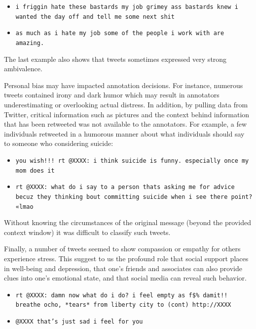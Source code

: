 \documentclass[11pt]{article}
\begin{document}
\begin{itemize}
\footnotesize
\item \texttt{i friggin hate these bastards \@ my job grimey ass bastards knew i wanted the day off and tell me some next shit}
\item \texttt{as much as i hate my job some of the people i work with are amazing.}
\end{itemize}

The last example also shows that tweets sometimes expressed very strong ambivalence.

Personal bias may have impacted annotation decisions. For instance, numerous tweets contained irony and dark humor which may result in annotators underestimating or overlooking actual distress. In addition, by pulling data from Twitter, critical information such as pictures and the context behind information that has been retweeted was not available to the annotators.  For example, a few individuals retweeted in a humorous manner about what individuals should say to someone who considering suicide:

\begin{itemize}
\footnotesize
\item \texttt{you wish!!! rt @XXXX: i think suicide is funny. especially once my mom does it}
\item \texttt{rt @XXXX: what do i say to a person thats asking me for advice becuz they thinking bout committing suicide when i see there point? «lmao}
\end{itemize}
Without knowing the circumstances of the original message (beyond the provided context window) it was difficult to classify such tweets.  %

Finally, a number of tweets seemed to show compassion or empathy for others experience stress. This suggest to us the profound role that social support places in well-being and depression, that one's friends and associates can also provide clues into one's emotional state, and that social media can reveal such behavior.

\begin{itemize}
\footnotesize
\item \texttt{rt @XXXX: damn now what do i do? i feel empty as f\$\% damit!! breathe ocho, *tears* from liberty city to (cont) http://XXXX}
\item \texttt{@XXXX that's just sad i feel for you }
\end{itemize}
\end{document}
